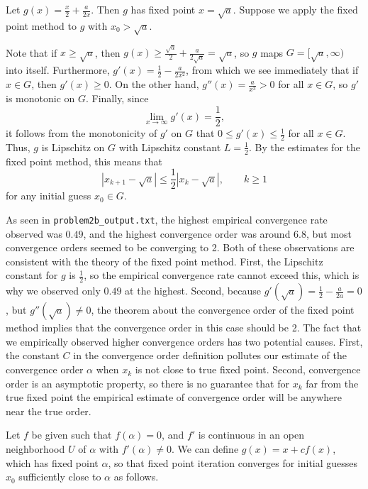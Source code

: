 \documentclass{homework}
\begin{document}
\question Let $g(x) = \frac{x}{2} + \frac{a}{2x}$. Then $g$ has fixed point $x = \sqrt{a}$. Suppose we apply the fixed point method to $g$ with $x_0 > \sqrt{a}$.
\begin{alphaparts}
	\questionpart Note that if $x \ge \sqrt{a}$, then $g(x) \ge \frac{\sqrt{a}}{2} + \frac{a}{2\sqrt{a}} = \sqrt{a}$, so $g$ maps $G = [\sqrt{a}, \infty)$ into itself. Furthermore, $g'(x) = \frac{1}{2} - \frac{a}{2x^2}$, from which we see immediately that if $x \in G$, then $g'(x) \ge 0$. On the other hand, $g''(x) = \frac{a}{x^3} >0$ for all $x \in G$, so $g'$ is monotonic on $G$. Finally, since
	\begin{equation*}
		\lim_{x\to\infty}g'(x) = \frac{1}{2},
	\end{equation*}
	it follows from the monotonicity of $g'$ on $G$ that $0 \le g'(x) \le \frac{1}{2}$ for all $x \in G$. Thus, $g$ is Lipschitz on $G$ with Lipschitz constant $L = \frac{1}{2}$. By the estimates for the fixed point method, this means that
	\begin{equation*}
		|x_{k+1} - \sqrt{a}| \le \frac{1}{2}|x_k - \sqrt{a}|, \qquad k \ge 1
	\end{equation*}
	for any initial guess $x_0 \in G$.
	
	\questionpart As seen in \texttt{problem2b\_output.txt}, the highest empirical convergence rate observed was $0.49$, and the highest convergence order was around $6.8$, but most convergence orders seemed to be converging to 2. Both of these observations are consistent with the theory of the fixed point method. First, the Lipschitz constant for $g$ is $\frac{1}{2}$, so the empirical convergence rate cannot exceed this, which is why we observed only $0.49$ at the highest. Second, because $g'(\sqrt{a}) = \frac{1}{2} - \frac{a}{2a}=0$, but $g''(\sqrt{a}) \ne 0$, the theorem about the convergence order of the fixed point method implies that the convergence order in this case should be 2. The fact that we empirically observed higher convergence orders has two potential causes. First, the constant $C$ in the convergence order definition pollutes our estimate of the convergence order $\alpha$ when $x_k$ is not close to true fixed point. Second, convergence order is an asymptotic property, so there is no guarantee that for $x_k$ far from the true fixed point the empirical estimate of convergence order will be anywhere near the true order.
\end{alphaparts}

\question Let $f$ be given such that $f(\alpha) = 0$, and $f'$ is continuous in an open neighborhood $U$ of $\alpha$ with $f'(\alpha) \ne 0$. We can define $g(x) = x + cf(x)$, which has fixed point $\alpha$, so that fixed point iteration converges for initial guesses $x_0$ sufficiently close to $\alpha$ as follows.
\end{document}
